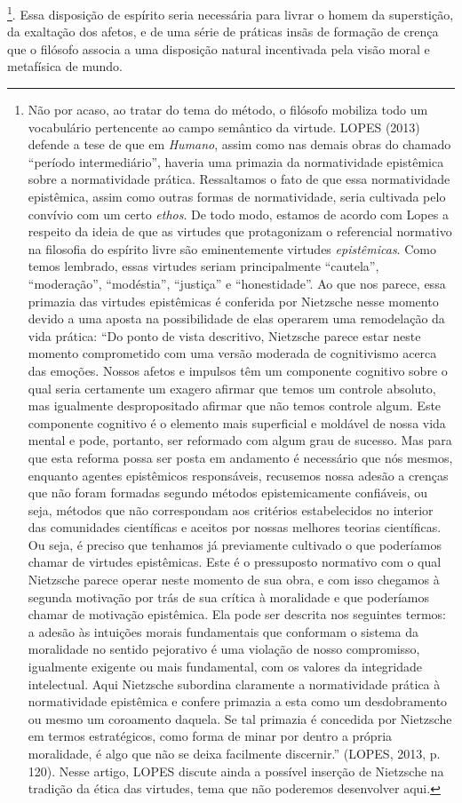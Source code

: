\documentclass[
	12pt,				%
	openright,			%
	oneside,			%
	a4paper,			%
	english,			%
	french,				%
	spanish,			%
	brazil				%
	]{abntex2}
\begin{document}
\footnote{Não por acaso, ao tratar do tema do método, o filósofo mobiliza todo um vocabulário pertencente ao campo semântico da virtude. LOPES (2013) defende a tese de que em \textit{Humano}, assim como nas demais obras do chamado “período intermediário”, haveria uma primazia da normatividade epistêmica sobre a normatividade prática. Ressaltamos o fato de que essa normatividade epistêmica, assim como outras formas de normatividade, seria cultivada pelo convívio com um certo \textit{ethos}. De todo modo, estamos de acordo com Lopes a respeito da ideia de que as virtudes que protagonizam o referencial normativo na filosofia do espírito livre são eminentemente virtudes \textit{epistêmicas}. Como temos lembrado, essas virtudes seriam principalmente “cautela”, “moderação”, “modéstia”, “justiça” e “honestidade”. Ao que nos parece, essa primazia das virtudes epistêmicas é conferida por Nietzsche nesse momento devido a uma aposta na possibilidade de elas operarem uma remodelação da vida prática: “Do ponto de vista descritivo, Nietzsche parece estar neste momento comprometido com uma versão moderada de cognitivismo acerca das emoções. Nossos afetos e impulsos têm um componente cognitivo sobre o qual seria certamente um exagero afirmar que temos um controle absoluto, mas igualmente despropositado afirmar que não temos controle algum. Este componente cognitivo é o elemento mais superficial e moldável de nossa vida mental e pode, portanto, ser reformado com algum grau de sucesso. Mas para que esta reforma possa ser posta em andamento é necessário que nós mesmos, enquanto agentes epistêmicos responsáveis, recusemos nossa adesão a crenças que não foram formadas segundo métodos epistemicamente confiáveis, ou seja, métodos que não correspondam aos critérios estabelecidos no interior das comunidades científicas e aceitos por nossas melhores teorias científicas. Ou seja, é preciso que tenhamos já previamente cultivado o que poderíamos chamar de virtudes epistêmicas. Este é o pressuposto normativo com o qual Nietzsche parece operar neste momento de sua obra, e com isso chegamos à segunda motivação por trás de sua crítica à moralidade e que poderíamos chamar de motivação epistêmica. Ela pode ser descrita nos seguintes termos: a adesão às intuições morais fundamentais que conformam o sistema da moralidade no sentido pejorativo é uma violação de nosso compromisso, igualmente exigente ou mais fundamental, com os valores da integridade intelectual. Aqui Nietzsche subordina claramente a normatividade prática à normatividade epistêmica e confere primazia a esta como um desdobramento ou mesmo um coroamento daquela. Se tal primazia é concedida por Nietzsche em termos estratégicos, como forma de minar por dentro a própria moralidade, é algo que não se deixa facilmente discernir.” (LOPES, 2013, p. 120). Nesse artigo, LOPES discute ainda a possível inserção de Nietzsche na tradição da ética das virtudes, tema que não poderemos desenvolver aqui. }. 
Essa disposição de espírito seria necessária para livrar o homem da superstição, da exaltação dos afetos, e de uma série de práticas insãs de formação de crença que o filósofo associa a uma disposição natural incentivada pela visão moral e metafísica de mundo. 
\end{document}
